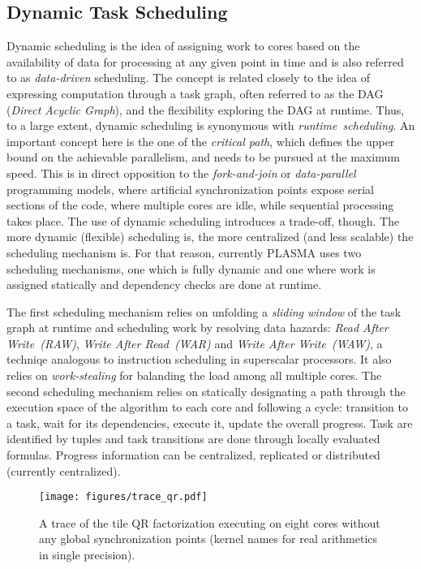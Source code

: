 
\subsection{Dynamic Task Scheduling}

Dynamic scheduling is the idea of assigning work to cores based on the availability of data
for processing at any given point in time and is also referred to as \mbox{\em data-driven}
scheduling.
The concept is related closely to the idea of expressing computation through a task graph,
often referred to as the DAG ({\em Direct Acyclic Graph}), and the flexibility exploring
the DAG at runtime.
Thus, to a large extent, dynamic scheduling is synonymous with \mbox{\em runtime scheduling}.
An important concept here is the one of the {\em critical path}, which defines the upper bound
on the achievable parallelism, and needs to be pursued at the maximum speed.
This is in direct opposition to the \mbox{\em fork-and-join} or \mbox{\em data-parallel}
programming models, where artificial synchronization points expose serial sections of
the code, where multiple cores are idle, while sequential processing takes place.
The use of dynamic scheduling introduces a \mbox{trade-off}, though.
The more dynamic (flexible) scheduling is, the more centralized (and less scalable)
the scheduling mechanism is.
For that reason, currently PLASMA uses two scheduling mechanisms, one which is fully dynamic
and one where work is assigned statically and dependency checks are done at runtime.

The first scheduling mechanism relies on unfolding a {\em sliding window} of the task graph
at runtime and scheduling work by resolving data hazards: {\em Read After Write~(RAW)},
{\em Write After Read~(WAR)} and {\em Write After Write~(WAW)}, a techniqe analogous
to instruction scheduling in superscalar processors.
It also relies on \mbox{\em work-stealing} for balanding the load among all multiple cores.
The second scheduling mechanism relies on statically designating a path through the execution
space of the algorithm to each core and following a cycle: transition to a task, wait for its
dependencies, execute it, update the overall progress.
Task are identified by tuples and task transitions are done through locally evaluated formulas.
Progress information can be centralized, replicated or distributed (currently centralized).

\begin{figure}[h!]
\centering
\texttt{[image: figures/trace\_qr.pdf]}
\caption{A trace of the tile QR factorization executing on eight cores
         without any global synchronization points
         (kernel names for real arithmetics in single precision).}
\label{fig:cholesky_trace}
\end{figure}

